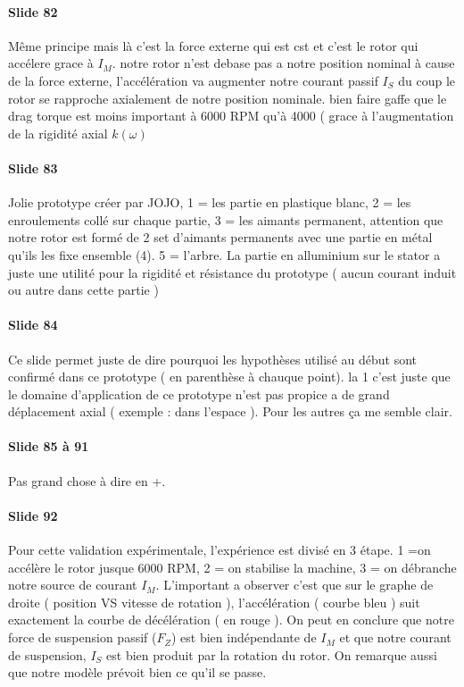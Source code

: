 \paragraph{Slide 82} Même principe mais là c'est la force externe qui est cst et c'est le rotor qui accélere grace à $I_M$. notre rotor n'est debase pas a notre position nominal à cause de la force externe, l'accélération va augmenter notre courant passif $I_S$ du coup le rotor se rapproche axialement de notre position nominale. bien faire gaffe que le drag torque est moins important à 6000 RPM qu'à 4000 ( grace à l'augmentation de la rigidité axial $k(\omega)$

\paragraph{Slide 83} Jolie prototype créer par JOJO, 1 = les partie en plastique blanc, 2 = les enroulements collé sur chaque partie, 3 = les aimants permanent, attention que notre rotor est formé de 2 set d'aimants permanents avec une partie en métal qu'ils les fixe ensemble (4). 5 = l'arbre. La partie en alluminium sur le stator a juste une utilité pour la rigidité et résistance du prototype ( aucun courant induit ou autre dans cette partie ) 
\paragraph{Slide 84} Ce slide permet juste de dire pourquoi les hypothèses utilisé au début sont confirmé dans ce prototype ( en parenthèse à chauque point). la 1 c'est juste que le domaine d'application de ce prototype n'est pas propice a de grand déplacement axial ( exemple : dans l'espace ). Pour les autres ça me semble clair. 

\paragraph{Slide 85 à 91} Pas grand chose à dire en +.

\paragraph{Slide 92} Pour cette validation expérimentale, l'expérience est divisé en 3 étape. 1 =on accélère le rotor jusque 6000 RPM, 2 = on stabilise la machine, 3 = on débranche notre source de courant $I_M$. L'important a observer c'est que sur le graphe de droite ( position VS vitesse de rotation ), l'accélération ( courbe bleu ) suit exactement la courbe de décélération ( en rouge ). On peut en conclure que notre force de suspension passif ($F_Z$) est bien indépendante de $I_M$ et que notre courant de suspension, $I_S$ est bien produit par la rotation du rotor. On remarque aussi que notre modèle prévoit bien ce qu'il se passe.  

